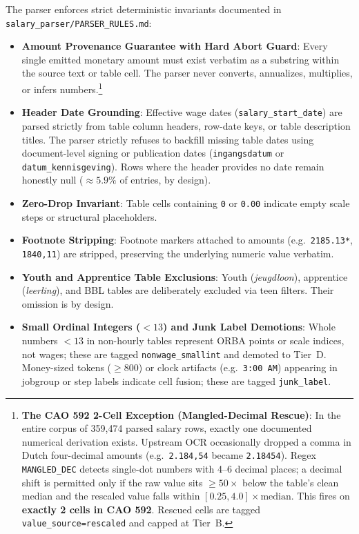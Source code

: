 The parser enforces strict deterministic invariants documented in \nolinkurl{salary_parser/PARSER_RULES.md}:
\begin{itemize}[leftmargin=1.5em]
  \item \textbf{Amount Provenance Guarantee with Hard Abort Guard}: Every single emitted monetary amount must exist verbatim as a substring within the source text or table cell. The parser never converts, annualizes, multiplies, or infers numbers.\footnote{\textbf{The CAO 592 2-Cell Exception (Mangled-Decimal Rescue)}: In the entire corpus of 359,474 parsed salary rows, exactly one documented numerical derivation exists. Upstream OCR occasionally dropped a comma in Dutch four-decimal amounts (e.g.\ \texttt{2.184,54} became \texttt{2.18454}). Regex \texttt{MANGLED\_DEC} detects single-dot numbers with 4--6 decimal places; a decimal shift is permitted only if the raw value sits $\ge 50\times$ below the table's clean median and the rescaled value falls within $[0.25, 4.0] \times \text{median}$. This fires on \textbf{exactly 2 cells in CAO 592}. Rescued cells are tagged \texttt{value\_source=rescaled} and capped at Tier~B.}
  \item \textbf{Header Date Grounding}: Effective wage dates (\texttt{salary\_start\_date}) are parsed strictly from table column headers, row-date keys, or table description titles. The parser strictly refuses to backfill missing table dates using document-level signing or publication dates (\texttt{ingangsdatum} or \texttt{datum\_kennisgeving}). Rows where the header provides no date remain honestly null ($\approx 5.9\%$ of entries, by design).
  \item \textbf{Zero-Drop Invariant}: Table cells containing \texttt{0} or \texttt{0.00} indicate empty scale steps or structural placeholders.
  \item \textbf{Footnote Stripping}: Footnote markers attached to amounts (e.g.\ \texttt{2185.13*}, \texttt{1840,11\dag}) are stripped, preserving the underlying numeric value verbatim.
  \item \textbf{Youth and Apprentice Table Exclusions}: Youth (\emph{jeugdloon}), apprentice (\emph{leerling}), and BBL tables are deliberately excluded via teen filters. Their omission is by design.
  \item \textbf{Small Ordinal Integers ($< 13$) and Junk Label Demotions}: Whole numbers $< 13$ in non-hourly tables represent ORBA points or scale indices, not wages; these are tagged \texttt{nonwage\_smallint} and demoted to Tier~D. Money-sized tokens ($\ge 800$) or clock artifacts (e.g.\ \texttt{3:00 AM}) appearing in jobgroup or step labels indicate cell fusion; these are tagged \texttt{junk\_label}.
\end{itemize}

